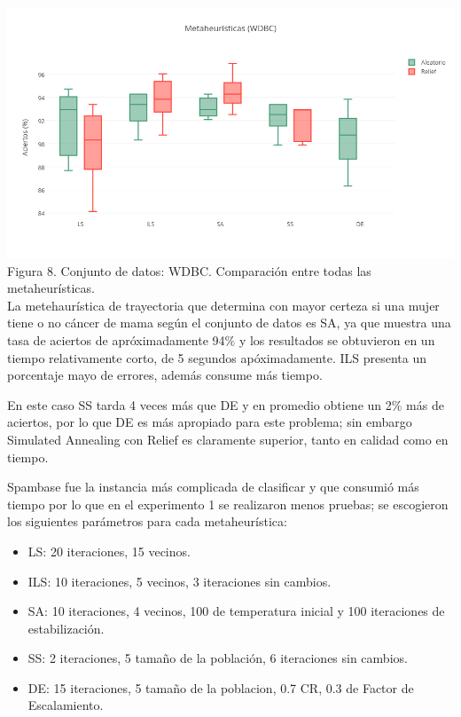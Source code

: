 \documentclass{ci5652}
\begin{document}
\includegraphics[width=\columnwidth]{metaheuristicas_WDBC}
{\small Figura 8. Conjunto de datos: WDBC. Comparación entre todas las metaheurísticas.}\\

La metehaurística de trayectoria que determina con mayor certeza si una mujer tiene o no cáncer de mama según el conjunto de datos es SA, ya que muestra una tasa de aciertos de apróximadamente 94\% y los resultados se obtuvieron en un tiempo relativamente corto, de 5 segundos apóximadamente. ILS presenta un porcentaje mayo de errores, además consume más tiempo.

En este caso SS tarda 4 veces más que DE y en promedio obtiene un 2\% más de aciertos, por lo que DE es más apropiado para este problema; sin embargo Simulated Annealing con Relief es claramente superior, tanto en calidad como en tiempo.

Spambase fue la instancia más complicada de clasificar y que consumió más tiempo por lo que en el experimento 1 se realizaron menos pruebas; se escogieron los siguientes parámetros para cada metaheurística:

\begin{itemize}
  \item LS: 20 iteraciones, 15 vecinos.
  \item ILS: 10 iteraciones, 5 vecinos, 3 iteraciones sin cambios.
  \item SA: 10 iteraciones, 4 vecinos, 100 de temperatura inicial y 100 iteraciones de estabilización.
  \item SS: 2 iteraciones, 5 tamaño de la población, 6 iteraciones sin cambios.
  \item DE: 15 iteraciones, 5 tamaño de la poblacion, 0.7 CR, 0.3 de Factor de Escalamiento.
\end{itemize}
\end{document}
